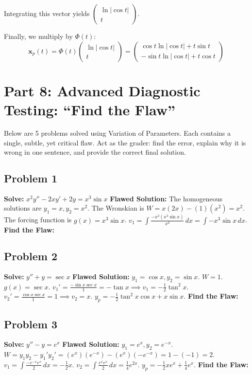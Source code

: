 \documentclass[12pt]{article}
\begin{document}
Integrating this vector yields $\begin{pmatrix} \ln|\cos t| \\ t \end{pmatrix}$.

Finally, we multiply by $\Phi(t)$:
\[ \mathbf{x}_p(t) = \Phi(t) \begin{pmatrix} \ln|\cos t| \\ t \end{pmatrix} = \begin{pmatrix} \cos t \ln|\cos t| + t \sin t \\ -\sin t \ln|\cos t| + t \cos t \end{pmatrix} \]

\newpage
\section{Part 8: Advanced Diagnostic Testing: ``Find the Flaw''}

Below are 5 problems solved using Variation of Parameters. Each contains a single, subtle, yet critical flaw. Act as the grader: find the error, explain why it is wrong in one sentence, and provide the correct final solution.

\subsection{Problem 1}
\textbf{Solve:} $x^2 y'' - 2x y' + 2y = x^3 \sin x$
\textbf{Flawed Solution:}
The homogeneous solutions are $y_1 = x, y_2 = x^2$.
The Wronskian is $W = x(2x) - (1)(x^2) = x^2$.
The forcing function is $g(x) = x^3 \sin x$.
$v_1 = \int \frac{-x^2 (x^3 \sin x)}{x^2} \, dx = \int -x^3 \sin x \, dx$.
\textbf{Find the Flaw:}
\vspace{2cm}

\subsection{Problem 2}
\textbf{Solve:} $y'' + y = \sec x$
\textbf{Flawed Solution:}
$y_1 = \cos x, y_2 = \sin x$. $W = 1$. $g(x) = \sec x$.
$v_1' = \frac{-\sin x \sec x}{1} = -\tan x \implies v_1 = -\frac{1}{2}\tan^2 x$.
$v_2' = \frac{\cos x \sec x}{1} = 1 \implies v_2 = x$.
$y_p = -\frac{1}{2}\tan^2 x \cos x + x \sin x$.
\textbf{Find the Flaw:}
\vspace{2cm}

\subsection{Problem 3}
\textbf{Solve:} $y'' - y = e^x$
\textbf{Flawed Solution:}
$y_1 = e^x, y_2 = e^{-x}$.
$W = y_1 y_2 - y_1' y_2' = (e^x)(e^{-x}) - (e^x)(-e^{-x}) = 1 - (-1) = 2$.
$v_1 = \int \frac{-e^{-x} e^x}{2} \, dx = -\frac{1}{2}x$.
$v_2 = \int \frac{e^x e^x}{2} \, dx = \frac{1}{4}e^{2x}$.
$y_p = -\frac{1}{2}x e^x + \frac{1}{4}e^x$.
\textbf{Find the Flaw:}
\vspace{2cm}
\end{document}
